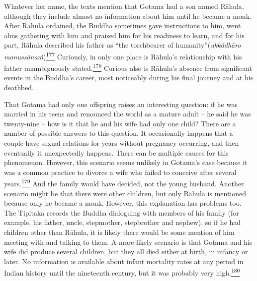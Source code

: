 Whatever her name, the texts mention that Gotama had a son named Rāhula,
although they include almost no information about him until he became a
monk. After Rāhula ordained, the Buddha sometimes gave instructions to
him, went alms gathering with him and praised him for his readiness to
learn, and for his part, Rāhula described his father as ``the
torchbearer of humanity''(\emph{ukkādhāro
manussānaṁ})\label{footprints_split_009.html_fnref177}\hyperref[footprints_split_024.htmlux5cux23fn177]{\textsuperscript{177}}
Curiously, in only one place is Rāhula's relationship with his father
unambiguously
stated.\label{footprints_split_009.html_fnref178}\hyperref[footprints_split_024.htmlux5cux23fn178]{\textsuperscript{178}}
Curious also is Rāhula's absence from significant events in the Buddha's
career, most noticeably during his final journey and at his deathbed.

That Gotama had only one offspring raises an interesting question: if he
was married in his teens and renounced the world as a mature adult -- he
said he was twenty-nine -- how is it that he and his wife had only one
child? There are a number of possible answers to this question. It
occasionally happens that a couple have sexual relations for years
without pregnancy occurring, and then eventually it unexpectedly
happens. There can be multiple causes for this phenomenon. However, this
scenario seems unlikely in Gotama's case because it was a common
practice to divorce a wife who failed to conceive after several
years.\label{footprints_split_009.html_fnref179}\hyperref[footprints_split_024.htmlux5cux23fn179]{\textsuperscript{179}}
And the family would have decided, not the young husband. Another
scenario might be that there were other children, but only Rāhula is
mentioned because only he became a monk. However, this explanation has
problems too. The Tipitaka records the Buddha dialoguing with members of
his family (for example, his father, uncle, stepmother, stepbrother and
nephew), so if he had children other than Rāhula, it is likely there
would be some mention of him meeting with and talking to them. A more
likely scenario is that Gotama and his wife did produce several
children, but they all died either at birth, in infancy or later. No
information is available about infant mortality rates at any period in
Indian history until the nineteenth century, but it was probably very
high.\label{footprints_split_009.html_fnref180}\hyperref[footprints_split_024.htmlux5cux23fn180]{\textsuperscript{180}}

